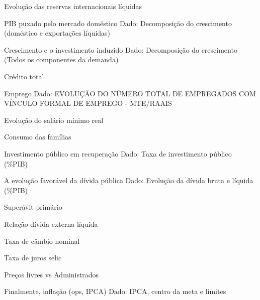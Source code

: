 \documentclass[presentation]{beamer}
\begin{document}
\begin{frame}[label={sec:orgba04616}]{Evolução das reservas internacionais líquidas}
\end{frame}

\begin{frame}[label={sec:orgf3279bf}]{PIB puxado pelo mercado doméstico}
\alert{Dado:} Decomposição do crescimento (doméstico e exportações líquidas)
\end{frame}

\begin{frame}[label={sec:orgcf0bfac}]{Crescimento e o investimento induzido}
\alert{Dado:} Decomposição do crescimento (Todos os componentes da demanda)
\end{frame}


\begin{frame}[label={sec:org15e842a}]{Crédito total}
\end{frame}

\begin{frame}[label={sec:orga98f4d6}]{Emprego}
\alert{Dado:} EVOLUÇÃO DO NÚMERO TOTAL DE EMPREGADOS COM VÍNCULO FORMAL  DE EMPREGO - MTE/RAAIS
\end{frame}


\begin{frame}[label={sec:orgde65974}]{Evolução do salário mínimo real}
\end{frame}

\begin{frame}[label={sec:org579b585}]{Consumo das famílias}
\end{frame}

\begin{frame}[label={sec:orgef4ecee}]{Investimento público em recuperação}
\alert{Dado:} Taxa de investimento público (\%PIB)
\end{frame}

\begin{frame}[label={sec:org37716d4}]{A evolução favorável da dívida pública}
\alert{Dado:} Evolução da dívida bruta e líquida (\%PIB)
\end{frame}

\begin{frame}[label={sec:org753134b}]{Superávit primário}
\end{frame}

\begin{frame}[label={sec:orgb2a08f7}]{Relação dívida externa líquida}
\end{frame}


\begin{frame}[label={sec:orga3e118f}]{Taxa de câmbio nominal}
\end{frame}

\begin{frame}[label={sec:orgbfc65e0}]{Taxa de juros selic}
\end{frame}

\begin{frame}[label={sec:orgb76e00a}]{Preços livres vs Administrados}
\end{frame}

\begin{frame}[label={sec:orgb75de25}]{Finalmente, inflação (ops, IPCA)}
\alert{Dado:} IPCA, centro da meta e limites
\end{frame}
\end{document}
